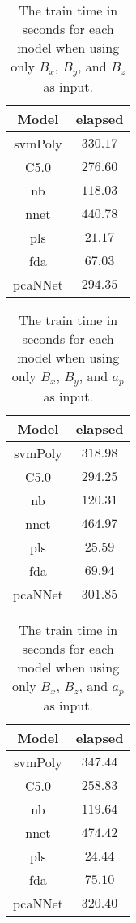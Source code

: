 \begin{table}[!ht]
	\centering
	\begin{tabular}{|c|c|}
		\hline
		Model & elapsed \\ \hline
		svmPoly & $330.17$ \\ \hline
		C5.0 & $276.60$ \\ \hline
		nb & $118.03$ \\ \hline
		nnet & $440.78$ \\ \hline
		pls & $21.17$ \\ \hline
		fda & $67.03$ \\ \hline
		pcaNNet & $294.35$ \\ \hline
	\end{tabular}
	\caption{The train time in seconds for each model when using only $B_{x}$, $B_{y}$, and $B_{z}$ as input.}
	\label{tab:time:coord:train}
\end{table}

\begin{table}[!ht]
	\centering
	\begin{tabular}{|c|c|}
		\hline
		Model & elapsed \\ \hline
		svmPoly & $318.98$ \\ \hline
		C5.0 & $294.25$ \\ \hline
		nb & $120.31$ \\ \hline
		nnet & $464.97$ \\ \hline
		pls & $25.59$ \\ \hline
		fda & $69.94$ \\ \hline
		pcaNNet & $301.85$ \\ \hline
	\end{tabular}
	\caption{The train time in seconds for each model when using only $B_{x}$, $B_{y}$, and $a_{p}$ as input.}
	\label{tab:time:xyap:train}
\end{table}

\begin{table}[!ht]
	\centering
	\begin{tabular}{|c|c|}
		\hline
		Model & elapsed \\ \hline
		svmPoly & $347.44$ \\ \hline
		C5.0 & $258.83$ \\ \hline
		nb & $119.64$ \\ \hline
		nnet & $474.42$ \\ \hline
		pls & $24.44$ \\ \hline
		fda & $75.10$ \\ \hline
		pcaNNet & $320.40$ \\ \hline
	\end{tabular}
	\caption{The train time in seconds for each model when using only $B_{x}$, $B_{z}$, and $a_{p}$ as input.}
	\label{tab:time:xzap:train}
\end{table}

